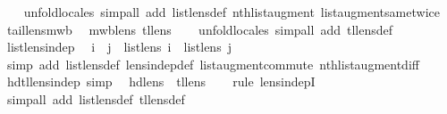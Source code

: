 \begin{isabellebody}
%
\isadelimproof
\ \ %
\endisadelimproof
%
\isatagproof
{}\isamarkupfalse%
\ {\isacharparenleft}unfold{\isacharunderscore}locales{\isacharcomma}\ simp{\isacharunderscore}all\ add{\isacharcolon}\ list{\isacharunderscore}lens{\isacharunderscore}def\ nth{\isacharprime}{\isacharunderscore}list{\isacharunderscore}augment\ list{\isacharunderscore}augment{\isacharunderscore}same{\isacharunderscore}twice{\isacharparenright}%
\endisatagproof
{\isafoldproof}%
%
\isadelimproof
\isanewline
%
\endisadelimproof
\isanewline
{}\isamarkupfalse%
\ tail{\isacharunderscore}lens{\isacharunderscore}mwb{\isacharcolon}\isanewline
\ \ {\isachardoublequoteopen}mwb{\isacharunderscore}lens\ tl{\isacharunderscore}lens{\isachardoublequoteclose}\isanewline
%
\isadelimproof
\ \ %
\endisadelimproof
%
\isatagproof
{}\isamarkupfalse%
\ {\isacharparenleft}unfold{\isacharunderscore}locales{\isacharcomma}\ simp{\isacharunderscore}all\ add{\isacharcolon}\ tl{\isacharunderscore}lens{\isacharunderscore}def{\isacharparenright}%
\endisatagproof
{\isafoldproof}%
%
\isadelimproof
\isanewline
%
\endisadelimproof
\isanewline
{}\isamarkupfalse%
\ list{\isacharunderscore}lens{\isacharunderscore}indep{\isacharcolon}\isanewline
\ \ {\isachardoublequoteopen}i\ {\isasymnoteq}\ j\ {\isasymLongrightarrow}\ list{\isacharunderscore}lens\ i\ {\isasymbowtie}\ list{\isacharunderscore}lens\ j{\isachardoublequoteclose}\isanewline
%
\isadelimproof
\ \ %
\endisadelimproof
%
\isatagproof
{}\isamarkupfalse%
\ {\isacharparenleft}simp\ add{\isacharcolon}\ list{\isacharunderscore}lens{\isacharunderscore}def\ lens{\isacharunderscore}indep{\isacharunderscore}def\ list{\isacharunderscore}augment{\isacharunderscore}commute\ nth{\isacharprime}{\isacharunderscore}list{\isacharunderscore}augment{\isacharunderscore}diff{\isacharparenright}%
\endisatagproof
{\isafoldproof}%
%
\isadelimproof
\isanewline
%
\endisadelimproof
\isanewline
{}\isamarkupfalse%
\ hd{\isacharunderscore}tl{\isacharunderscore}lens{\isacharunderscore}indep\ {\isacharbrackleft}simp{\isacharbrackright}{\isacharcolon}\isanewline
\ \ {\isachardoublequoteopen}hd{\isacharunderscore}lens\ {\isasymbowtie}\ tl{\isacharunderscore}lens{\isachardoublequoteclose}\isanewline
%
\isadelimproof
\ \ %
\endisadelimproof
%
\isatagproof
{}\isamarkupfalse%
\ {\isacharparenleft}rule\ lens{\isacharunderscore}indepI{\isacharparenright}\isanewline
\ \ \isamarkupfalse%
\ {\isacharparenleft}simp{\isacharunderscore}all\ add{\isacharcolon}\ list{\isacharunderscore}lens{\isacharunderscore}def\ tl{\isacharunderscore}lens{\isacharunderscore}def{\isacharparenright}\isanewline

\end{isabellebody}
